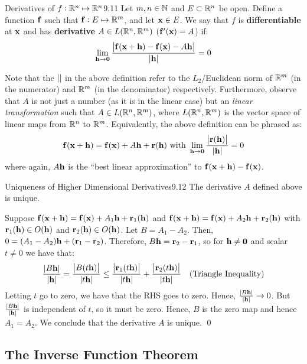 \begin{definition}{Derivatives of $f: \mathbb{R}^n \mapsto \mathbb{R}^n$}{9.11}
    Let $m, n \in \mathbb{N}$ and $E \subset \mathbb{R}^n$ be open. Define a function $\mathbf{f}$ such that $\mathbf{f}: E \mapsto \mathbb{R}^m$, and let $\mathbf{x} \in E$. We say that $f$ is \textbf{differentiable} at $\mathbf{x}$ and has \textbf{derivative} $A \in L(\mathbb{R}^n, \mathbb{R}^m)$ ($\mathbf{f}'(\mathbf{x}) = A$) if:
    \begin{align*}
        \lim_{\mathbf{h} \rightarrow \mathbf{0}} \frac{\abs{\mathbf{f}(\mathbf{x} + \mathbf{h}) - \mathbf{f}(\mathbf{x}) - A\mathbf{h}}}{\abs{\mathbf{h}}} = 0
    \end{align*}
\end{definition}
\noindent Note that the $\abs{}$ in the above definition refer to the $L_2$/Euclidean norm of $\mathbb{R}^m$ (in the numerator) and $\mathbb{R}^m$ (in the denominator) respectively. Furthermore, observe that $A$ is not just a number (as it is in the linear case) but an \emph{linear transformation} such that $A \in L(\mathbb{R}^n, \mathbb{R}^m)$, where $L(\mathbb{R}^n, \mathbb{R}^m)$ is the vector space of linear maps from $\mathbb{R}^n$ to $\mathbb{R}^m$. Equivalently, the above definition can be phrased as:
\begin{align*}
    \mathbf{f}(\mathbf{x} + \mathbf{h}) = \mathbf{f}(\mathbf{x}) + A\mathbf{h} + \mathbf{r}(\mathbf{h}) \text{ with } \lim_{\mathbf{h} \rightarrow \mathbf{0}} \frac{\abs{\mathbf{r}(\mathbf{h})}}{\abs{\mathbf{h}}} = 0
\end{align*}
where again, $A\mathbf{h}$ is the ``best linear approximation'' to $\mathbf{f}(\mathbf{x} + \mathbf{h}) - \mathbf{f}(\mathbf{x})$. 

\begin{theorem}{Uniqueness of Higher Dimensional Derivatives}{9.12}
    The derivative $A$ defined above is unique.
\end{theorem}
\begin{nproof}
    Suppose $\mathbf{f}(\mathbf{x} + \mathbf{h}) = \mathbf{f}(\mathbf{x}) + A_1\mathbf{h} + \mathbf{r}_1(\mathbf{h})$ and $\mathbf{f}(\mathbf{x} + \mathbf{h}) = \mathbf{f}(\mathbf{x}) + A_2\mathbf{h} + \mathbf{r}_2(\mathbf{h})$ with $\mathbf{r}_1(\mathbf{h}) \in O(\mathbf{h})$ and $\mathbf{r}_2(\mathbf{h}) \in O(\mathbf{h})$. Let $B = A_1 - A_2$. Then, $0 = (A_1 - A_2)\mathbf{h} + (\mathbf{r}_1 - \mathbf{r}_2)$. Therefore, $B\mathbf{h} = \mathbf{r}_2 - \mathbf{r}_1$, so for $\mathbf{h} \neq \mathbf{0}$ and scalar $t \neq 0$ we have that:
    \begin{align*}
        \frac{\abs{B\mathbf{h}}}{\abs{\mathbf{h}}} = \frac{\abs{B(t\mathbf{h})}}{\abs{t\mathbf{h}}} \leq \frac{\abs{\mathbf{r}_1(t\mathbf{h})}}{\abs{t\mathbf{h}}} + \frac{\abs{\mathbf{r}_2(t\mathbf{h})}}{\abs{t\mathbf{h}}} \quad \text{(Triangle Inequality)}
    \end{align*} 
    Letting $t$ go to zero, we have that the RHS goes to zero. Hence, $\frac{\abs{B\mathbf{h}}}{\abs{\mathbf{h}}} \rightarrow 0$. But $\frac{\abs{B\mathbf{h}}}{\abs{\mathbf{h}}}$ is independent of $t$, so it must be zero. Hence, $B$ is the zero map and hence $A_1 = A_2$. We conclude that the derivative $A$ is unique. \qed
\end{nproof}



\subsection{The Inverse Function Theorem}

